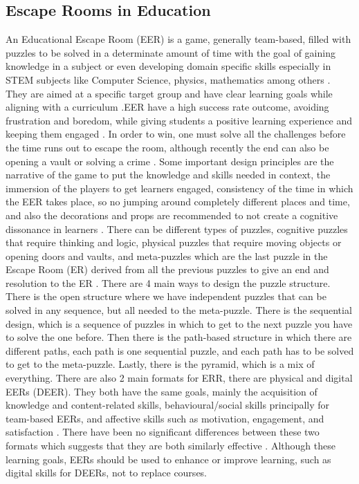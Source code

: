 \documentclass[sigconf, authorversion=true, nonacm=true]{acmart}%
\begin{document}
\subsection{Escape Rooms in Education}


An Educational Escape Room (EER) is a game, generally team-based, filled with puzzles to be solved in a determinate amount of time \cite{wiemker_elumir_clare_escape_room_2015} with the goal of gaining knowledge in a subject or even developing domain specific skills \cite{veldkamp_escape_2020} especially in STEM subjects like Computer Science, physics, mathematics among others \cite{makri_digital_2021}. They are aimed at a specific target group and have clear learning goals while aligning with a curriculum \cite{veldkamp_escape_2020}.EER have a high success rate outcome, avoiding frustration and boredom, while giving students a positive learning experience and keeping them engaged \cite{veldkamp_escape_2020, makri_digital_2021, jarvelainen_relativity_2023}. 
In order to win, one must solve all the challenges before the time runs out to escape the room, although recently the end can also be opening a vault or solving a crime \cite{veldkamp_escape_2020}.
Some important design principles are the narrative of the game to put the knowledge and skills needed in context, the immersion of the players to get learners engaged, consistency of the time in which the EER takes place, so no jumping around completely different places and time, and also the decorations and props are recommended to not create a cognitive dissonance in learners \cite{veldkamp_escape_2020}. 
There can be different types of puzzles, cognitive puzzles that require thinking and logic, physical puzzles that require moving objects or opening doors and vaults, and meta-puzzles which are the last puzzle in the Escape Room (ER) derived from all the previous puzzles to give an end and resolution to the ER \cite{veldkamp_escape_2020}.
There are 4 main ways to design the puzzle structure. There is the open structure where we have independent puzzles that can be solved in any sequence, but all needed to the meta-puzzle.
There is the sequential design, which is a sequence of puzzles in which to get to the next puzzle you have to solve the one before.
Then there is the path-based structure in which there are different paths, each path is one sequential puzzle, and each path has to be solved to get to the meta-puzzle.
Lastly, there is the pyramid, which is a mix of everything.
There are also 2 main formats for ERR, there are physical and digital EERs (DEER). They both have the same goals, mainly the acquisition of knowledge and content-related skills, behavioural/social skills principally for team-based EERs, and affective skills such as motivation, engagement, and satisfaction \cite{makri_digital_2021}. There have been no significant differences between these two formats which suggests that they are both similarly effective \cite{keller_digital_2025}. Although these learning goals, EERs should be used to enhance or improve learning, such as digital skills for DEERs, not to replace courses.
\end{document}

